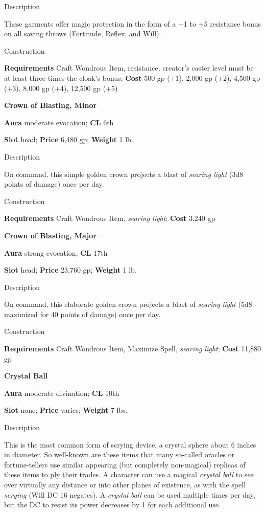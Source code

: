 Description
				
These garments offer magic protection in the form of a +1 to +5 resistance bonus on all saving throws (Fortitude, Reflex, and Will). 
				
Construction
				
\textbf{Requirements} Craft Wondrous Item, resistance\textit{,} creator's caster level must be at least three times the cloak's bonus; \textbf{Cost }500 gp (+1), 2,000 gp (+2), 4,500 gp (+3), 8,000 gp (+4), 12,500 gp (+5)
				
\textbf{Crown of Blasting, Minor}
				
\textbf{Aura} moderate evocation; \textbf{CL} 6th
				
\textbf{Slot }head; \textbf{Price} 6,480 gp; \textbf{Weight} 1 lb.
				
Description
				
On command, this simple golden crown projects a blast of \textit{searing light }(3d8 points of damage) once per day.
				
Construction
				
\textbf{Requirements }Craft Wondrous Item, \textit{searing light}; \textbf{Cost} 3,240 gp
				
\textbf{Crown of Blasting, Major}
				
\textbf{Aura} strong evocation; \textbf{CL} 17th
				
\textbf{Slot }head; \textbf{Price} 23,760 gp; \textbf{Weight} 1 lb.
				
Description
				
On command, this elaborate golden crown projects a blast of \textit{searing light }(5d8 maximized for 40 points of damage) once per day.
				
Construction
				
\textbf{Requirements }Craft Wondrous Item, Maximize Spell, \textit{searing light}; \textbf{Cost} 11,880 gp
				
\textbf{Crystal Ball}
				
\textbf{Aura} moderate divination;\textbf{ CL }10th
				
\textbf{Slot} none; \textbf{Price} varies; \textbf{Weight} 7 lbs.
				
Description
				
This is the most common form of scrying device, a crystal sphere about 6 inches in diameter. So well-known are these items that many so-called oracles or fortune-tellers use similar appearing (but completely non-magical) replicas of these items to ply their trades. A character can use a magical \textit{crystal ball} to see over virtually any distance or into other planes of existence, as with the spell \textit{scrying }(Will DC 16 negates). A \textit{crystal ball} can be used multiple times per day, but the DC to resist its power decreases by 1 for each additional use.
				
